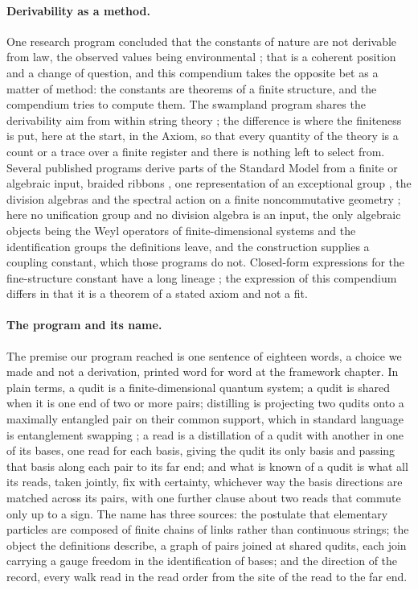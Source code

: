 \paragraph{Derivability as a method.} One research program concluded that the constants of nature are not derivable from law, the observed values being environmental \cite{Weinberg1987}; that is a coherent position and a change of question, and this compendium takes the opposite bet as a matter of method: the constants are theorems of a finite structure, and the compendium tries to compute them. The swampland program shares the derivability aim from within string theory \cite{Vafa2005}; the difference is where the finiteness is put, here at the start, in the Axiom, so that every quantity of the theory is a count or a trace over a finite register and there is nothing left to select from. Several published programs derive parts of the Standard Model from a finite or algebraic input, braided ribbons \cite{BilsonThompson2005}, one representation of an exceptional group \cite{Lisi2007}, the division algebras \cite{Furey2016} and the spectral action on a finite noncommutative geometry \cite{ChamseddineConnes1997}; here no unification group and no division algebra is an input, the only algebraic objects being the Weyl operators of finite-dimensional systems and the identification groups the definitions leave, and the construction supplies a coupling constant, which those programs do not. Closed-form expressions for the fine-structure constant have a long lineage \cite{Eddington1946}; the expression of this compendium differs in that it is a theorem of a stated axiom and not a fit.

\paragraph{The program and its name.} The premise our program reached is one sentence of eighteen words, a choice we made and not a derivation, printed word for word at the framework chapter. In plain terms, a qudit is a finite-dimensional quantum system; a qudit is shared when it is one end of two or more pairs; distilling is projecting two qudits onto a maximally entangled pair on their common support, which in standard language is entanglement swapping \cite{Zukowski1993}; a read is a distillation of a qudit with another in one of its bases, one read for each basis, giving the qudit its only basis and passing that basis along each pair to its far end; and what is known of a qudit is what all its reads, taken jointly, fix with certainty, whichever way the basis directions are matched across its pairs, with one further clause about two reads that commute only up to a sign. The name has three sources: the postulate that elementary particles are composed of finite chains of links rather than continuous strings; the object the definitions describe, a graph of pairs joined at shared qudits, each join carrying a gauge freedom in the identification of bases; and the direction of the record, every walk read in the read order from the site of the read to the far end.

